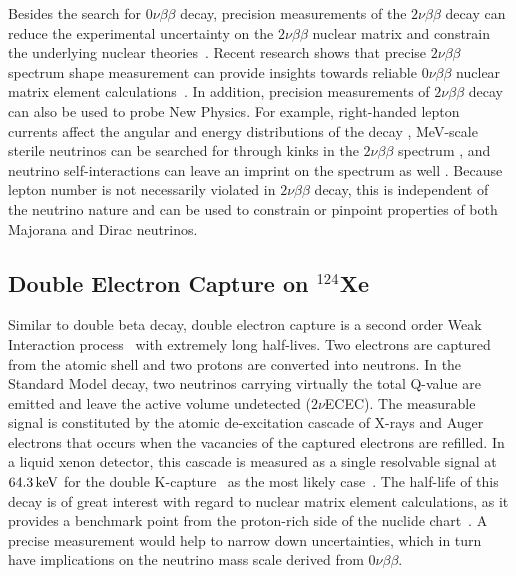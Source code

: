 Besides the search for $0\nu\beta\beta$ decay, precision measurements of the $2\nu\beta\beta$ decay can reduce the experimental uncertainty on the $2\nu\beta\beta$ nuclear matrix and constrain the underlying nuclear theories~\cite{Saakyan:2013yna}.  Recent research shows that precise $2\nu\beta\beta$ spectrum shape measurement can provide insights towards reliable $0\nu\beta\beta$ nuclear matrix element calculations~\cite{KamLAND-Zen:2019imh}. In addition, precision measurements of $2\nu\beta\beta$ decay can also be used to probe New Physics. For example, right-handed lepton currents affect the angular and energy distributions of the decay \cite{Deppisch:2020mxv}, MeV-scale sterile neutrinos can be searched for through kinks in the $2\nu\beta\beta$ spectrum \cite{Bolton:2020ncv, Agostini:2020cpz}, and neutrino self-interactions can leave an imprint on the spectrum as well \cite{Deppisch:2020sqh}. Because lepton number is not necessarily violated in $2\nu\beta\beta$ decay, this is independent of the neutrino nature and can be used to constrain or pinpoint properties of both Majorana and Dirac neutrinos.

\subsection{Double Electron Capture on \texorpdfstring{$^{124}$Xe}{Xenon-124}}\label{sec:dec}

Similar to double beta decay, double electron capture is a second order Weak Interaction process~\cite{Winter:1955zz} with extremely long half-lives. Two electrons are captured from the atomic shell and two protons are converted into neutrons. In the Standard Model decay, two neutrinos carrying virtually the total Q-value are emitted and leave the active volume undetected ($2\nu$ECEC). The measurable signal is constituted by the atomic de-excitation cascade of X-rays and Auger electrons that occurs when the vacancies of the captured electrons are refilled. In a liquid xenon detector, this cascade is measured as a single resolvable signal at $64.3\, \mathrm{keV}$ for the double K-capture~\cite{Nesterenko:2012xp} as the most likely case~\cite{Doi:1991xf}. The half-life of this decay is of great interest with regard to nuclear matrix element calculations, as it provides a benchmark point from the proton-rich side of the nuclide chart~\cite{Suhonen:2013rca,Pirinen:2015sma,Perez:2018cly}. A precise measurement would help to narrow down uncertainties, which in turn have implications on the neutrino mass scale derived from $0\nu\beta\beta$. 

